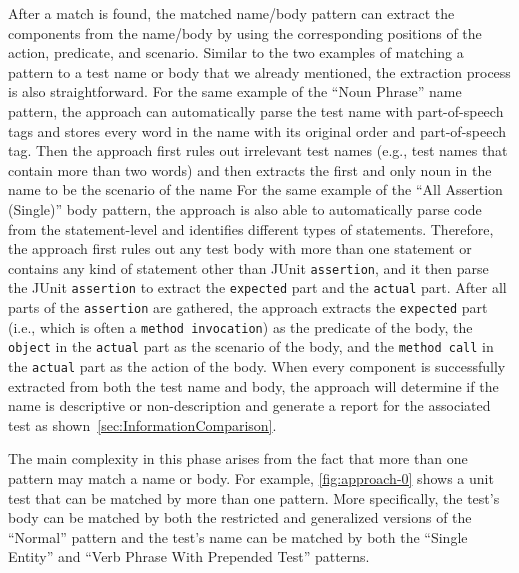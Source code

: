 \documentclass[proposal.tex]{subfiles}
\begin{document}
After a match is found, the matched name\slash body pattern can extract the components from the name\slash body by using the corresponding positions of the action, predicate, and scenario.
%
Similar to the two examples of matching a pattern to a test name or body that we already mentioned, the extraction process is also straightforward.
%
For the same example of the \enquote{Noun Phrase} name pattern, the approach can automatically parse the test name with part-of-speech tags and stores every word in the name with its original order and part-of-speech tag.
%
Then the approach first rules out irrelevant test names (e.g., test names that contain more than two words) and then extracts the first and only noun in the name to be the scenario of the name
%
For the same example of the \enquote{All Assertion (Single)} body pattern, the approach is also able to automatically parse code from the statement-level and identifies different types of statements.
%
Therefore, the approach first rules out any test body with more than one statement or contains any kind of statement other than JUnit \texttt{assertion}, and it then parse the JUnit \texttt{assertion} to extract the \texttt{expected} part and the \texttt{actual} part.
%
After all parts of the \texttt{assertion} are gathered, the approach extracts the \texttt{expected} part (i.e., which is often a \texttt{method invocation}) as the predicate of the body, the \texttt{object} in the \texttt{actual} part as the scenario of the body, and the \texttt{method call} in the \texttt{actual} part as the action of the body.
%
When every component is successfully extracted from both the test name and body, the approach will determine if the name is descriptive or non-description and generate a report for the associated test as shown~\cref{sec:InformationComparison}.


The main complexity in this phase arises from the fact that more than one pattern may match a name or body.
% 
For example, \cref{fig:approach-0} shows a unit test that can be matched by more than one pattern.
%
More specifically, the test's body can be matched by both the restricted and generalized versions of the \enquote{Normal} pattern and the test's name can be matched by both the \enquote{Single Entity} and \enquote{Verb Phrase With Prepended Test} patterns.
\end{document}
